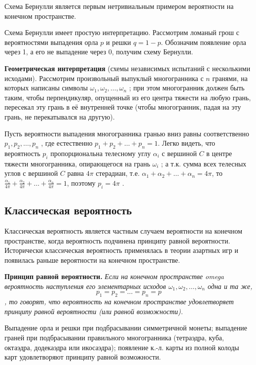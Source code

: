 Схема Бернулли является первым нетривиальным примером вероятности на конечном пространстве.

Схема Бернулли имеет простую интерпретацию. Рассмотрим ломаный грош с вероятностями выпадения орла $p$ и решки $q = 1 − p$. Обозначим появление орла через 1, а его не выпадение через 0, получим схему Бернулли.

\textbf{Геометрическая интерпретация} (схемы независимых испытаний с несколькими исходами). Рассмотрим произвольный выпуклый многогранника с $n$ гранями, на которых написаны символы $\omega_1 , \omega_2 , \ldots , \omega_n$ ; при этом многогранник должен быть таким, чтобы перпендикуляр, опущенный из его центра тяжести на любую грань, пересекал эту грань в её внутренней точке (чтобы многогранник, падая на эту грань, не перекатывался на другую).

Пусть вероятности выпадения многогранника гранью вниз равны соответственно $p_1 , p_2 , \ldots , p_n$ , где естественно $p_1 + p_2 + \ldots +p_n = 1$. Легко видеть, что вероятность $p_i$ пропорциональна телесному углу $\alpha_i$ с вершиной $C$ в центре тяжести многогранника, опирающегося на грань $\omega_i$ ; а т.к. сумма всех телесных углов с вершиной $C$ равна $4\pi$ стерадиан, т.е. $\alpha_1 + \alpha_2 + \ldots + \alpha_n = 4\pi$, то
$\frac{\alpha_1}{4\pi} + \frac{\alpha_2}{4\pi} + \ldots + \frac{\alpha_n}{4\pi}
 = 1$, поэтому $p_i = 4\pi$ .

\subsection{Классическая вероятность}

Классическая вероятность является частным случаем вероятности на конечном пространстве, когда вероятность подчинена принципу равной вероятности. Исторически классическая вероятность применялась в теории азартных игр и появилась раньше вероятности на конечном пространстве.

\textbf{Принцип равной вероятности.} \textit{Если на конечном пространстве omega вероятность наступления его элементарных исходов $\omega_1 , \omega_2 , \ldots , \omega_n$ одна и та же,
$$p_1 = p_2 = \ldots = p_n = p$$,
то говорят, что вероятность на конечном пространстве удовлетворяет
принципу равной вероятности (или равной возможности).}

Выпадение орла и решки при подбрасывании симметричной монеты; выпадение граней при подбрасывании правильного многогранника (тетраэдра, куба, октаэдра, додекаэдра или икосаэдра); появление к.-л. карты из полной
колоды карт удовлетворяют принципу равной возможности.

